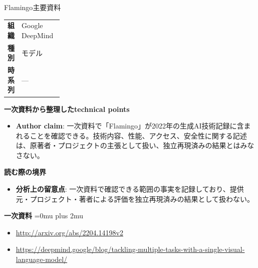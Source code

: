 \begin{technicalnote}{Flamingo}{主要資料}
\begingroup
\begin{tabularx}{\linewidth}{@{}>{\bfseries}p{0.22\linewidth}X@{}}
組織 & Google DeepMind \\
種別 & モデル \\
時系列 & — \\
\end{tabularx}
\smallskip
{\bfseries 一次資料から整理したtechnical points}
\begin{itemize}[leftmargin=1.5em,itemsep=0.35em]
\item \textbf{Author claim}: 一次資料で「Flamingo」が2022年の生成AI技術記録に含まれることを確認できる。技術内容、性能、アクセス、安全性に関する記述は、原著者・プロジェクトの主張として扱い、独立再現済みの結果とはみなさない。
\end{itemize}
\begin{minipage}{\linewidth}
{\bfseries 読む際の境界}
\begin{itemize}[leftmargin=1.5em,itemsep=0.35em]
\item \textbf{分析上の留意点}: 一次資料で確認できる範囲の事実を記録しており、提供元・プロジェクト・著者による評価を独立再現済みの結果として扱わない。
\end{itemize}
\begin{samepage}
{\bfseries 一次資料}
\begingroup\sloppy
\Urlmuskip=0mu plus 2mu\relax
\begin{itemize}[leftmargin=1.5em,itemsep=0.25em]
\item {\scriptsize\url{http://arxiv.org/abs/2204.14198v2}}
\item {\scriptsize\url{https://deepmind.google/blog/tackling-multiple-tasks-with-a-single-visual-language-model/}}
\end{itemize}
\endgroup
\end{samepage}
\end{minipage}
\endgroup
\end{technicalnote}
\medskip


